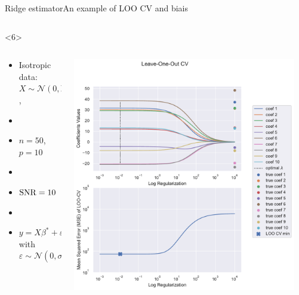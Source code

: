 \documentclass[10pt,aspectratio=43]{beamer}
\begin{document}
\begin{frame}{Ridge estimator}{An example of LOO CV and biais}
\begin{onlyenv}
\begin{columns}
\begin{column}{0.7\textwidth}
\begin{center}
                 \end{center}
            \end{column}
            \end{columns}
    \end{onlyenv}
    \begin{onlyenv}<6>
        \begin{columns}
            \begin{column}{0.4\textwidth}
                \begin{itemize}
                    \item Isotropic data: $X\sim\mathcal{N}(0,\mathrm{Id})$,
                    \item[]
                    \item $n=50$, $p=10$
                    \item[]
                    \item \textcolor{red}{$\operatorname{SNR}=10$}
                    \item[]
                    \item $y = X\beta^*+\varepsilon$ with $\varepsilon\sim \mathcal{N}(0, \sigma^2\mathrm{Id})$
                \end{itemize}
            \end{column}
            \begin{column}{0.7\textwidth}
                \begin{center}
                        \includegraphics[width=0.95\textwidth]{path_ridge_complete_10_.pdf}
                 \end{center}
            \end{column}
            \end{columns}
    \end{onlyenv}
\end{frame}
\end{document}
